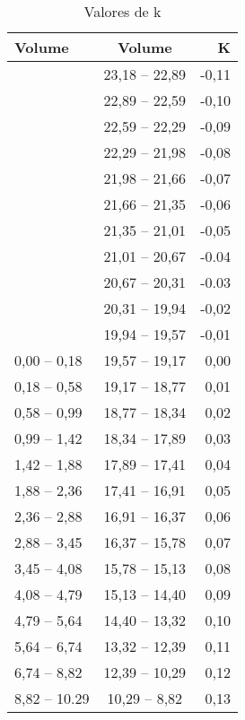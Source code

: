 \documentclass[a4paper,10pt]{SelfArx}
\begin{document}
\begin{table}[H]
\centering
\begin{tabular}{|l|c|r|}
\hline
\hline
Volume & Volume & K \\
\hline
\hline
& 23,18 -- 22,89  & -0,11  \\
& 22,89 -- 22,59 & -0,10  \\
& 22,59 -- 22,29 & -0,09  \\
& 22,29 -- 21,98 & -0,08  \\
& 21,98 -- 21,66 & -0,07  \\
& 21,66 -- 21,35 & -0,06  \\
& 21,35 -- 21,01 & -0,05  \\
& 21,01 -- 20,67 & -0.04  \\
& 20,67 -- 20,31 & -0.03  \\
& 20,31 -- 19,94 & -0,02  \\
& 19,94 -- 19,57 & -0,01  \\
0,00 -- 0,18 & 19,57 -- 19,17 & 0,00  \\
0,18 -- 0,58 & 19,17 -- 18,77 & 0,01  \\
0,58 -- 0,99 & 18,77 -- 18,34 & 0,02  \\
0,99 -- 1,42 & 18,34 -- 17,89 & 0,03  \\
1,42 -- 1,88 & 17,89 -- 17,41 & 0,04  \\
1,88 -- 2,36 & 17,41 -- 16,91 & 0,05  \\
2,36 -- 2,88 & 16,91 -- 16,37 & 0,06  \\
2,88 -- 3,45 & 16,37 -- 15,78 & 0,07  \\
3,45 -- 4,08 & 15,78 -- 15,13 & 0,08  \\
4,08 -- 4,79 & 15,13 -- 14,40 & 0,09  \\
4,79 -- 5,64 & 14,40 -- 13,32 & 0,10  \\
5,64 -- 6,74 & 13,32 -- 12,39 & 0,11  \\
6,74 -- 8,82 & 12,39 -- 10,29 & 0,12 \\
8,82 -- 10.29 & 10,29 -- 8,82 & 0,13  \\ [1ex] %
\hline
\end{tabular}
\caption{Valores de k}
\label{ex:Tabela 1}
\end{table}
\end{document}
